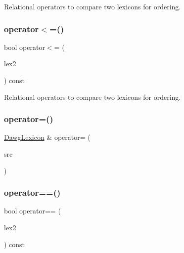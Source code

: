 Relational operators to compare two lexicons for ordering. 

\mbox{\label{classDawgLexicon_a054b62f48d59746ad45e92c1b278463e}} 
\subsubsection{\texorpdfstring{operator$<$=()}{operator<=()}}
{\footnotesize\ttfamily bool operator$<$= (\begin{DoxyParamCaption}\item[{const \mbox{\hyperlink{classDawgLexicon}{Dawg\+Lexicon}} \&}]{lex2 }\end{DoxyParamCaption}) const}



Relational operators to compare two lexicons for ordering. 

\mbox{\label{classDawgLexicon_a49b7a2bbf9b046065610b18f6ee07889}} 
\subsubsection{\texorpdfstring{operator=()}{operator=()}}
{\footnotesize\ttfamily \mbox{\hyperlink{classDawgLexicon}{Dawg\+Lexicon}} \& operator= (\begin{DoxyParamCaption}\item[{const \mbox{\hyperlink{classDawgLexicon}{Dawg\+Lexicon}} \&}]{src }\end{DoxyParamCaption})}

\mbox{\label{classDawgLexicon_a3703f712d34b03fe8ea4f7037ed1cb26}} 
\subsubsection{\texorpdfstring{operator==()}{operator==()}}
{\footnotesize\ttfamily bool operator== (\begin{DoxyParamCaption}\item[{const \mbox{\hyperlink{classDawgLexicon}{Dawg\+Lexicon}} \&}]{lex2 }\end{DoxyParamCaption}) const}



